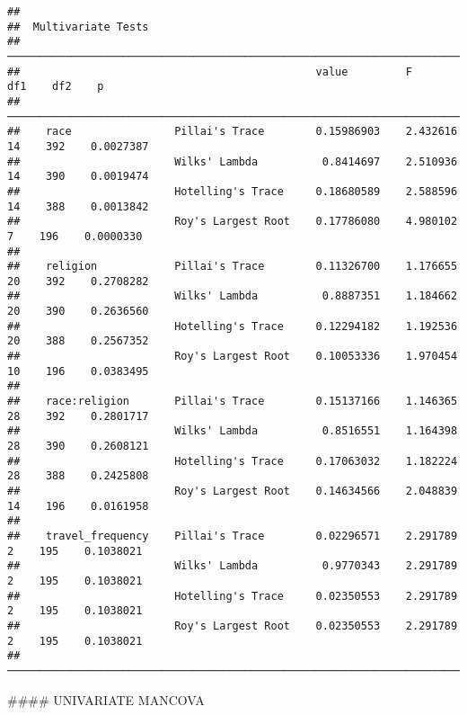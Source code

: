 \documentclass[
]{article}
\begin{document}
\begin{verbatim}
## 
##  Multivariate Tests                                                                              
##  ─────────────────────────────────────────────────────────────────────────────────────────────── 
##                                              value         F           df1    df2    p           
##  ─────────────────────────────────────────────────────────────────────────────────────────────── 
##    race                Pillai's Trace        0.15986903    2.432616     14    392    0.0027387   
##                        Wilks' Lambda          0.8414697    2.510936     14    390    0.0019474   
##                        Hotelling's Trace     0.18680589    2.588596     14    388    0.0013842   
##                        Roy's Largest Root    0.17786080    4.980102      7    196    0.0000330   
##                                                                                                  
##    religion            Pillai's Trace        0.11326700    1.176655     20    392    0.2708282   
##                        Wilks' Lambda          0.8887351    1.184662     20    390    0.2636560   
##                        Hotelling's Trace     0.12294182    1.192536     20    388    0.2567352   
##                        Roy's Largest Root    0.10053336    1.970454     10    196    0.0383495   
##                                                                                                  
##    race:religion       Pillai's Trace        0.15137166    1.146365     28    392    0.2801717   
##                        Wilks' Lambda          0.8516551    1.164398     28    390    0.2608121   
##                        Hotelling's Trace     0.17063032    1.182224     28    388    0.2425808   
##                        Roy's Largest Root    0.14634566    2.048839     14    196    0.0161958   
##                                                                                                  
##    travel_frequency    Pillai's Trace        0.02296571    2.291789      2    195    0.1038021   
##                        Wilks' Lambda          0.9770343    2.291789      2    195    0.1038021   
##                        Hotelling's Trace     0.02350553    2.291789      2    195    0.1038021   
##                        Roy's Largest Root    0.02350553    2.291789      2    195    0.1038021   
##  ───────────────────────────────────────────────────────────────────────────────────────────────
\end{verbatim}

\hfill\break
\#\#\#\# UNIVARIATE MANCOVA
\end{document}
